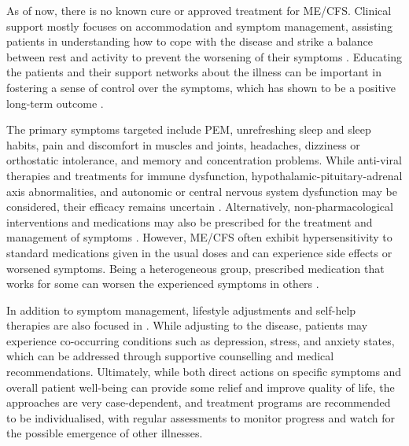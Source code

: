 As of now, there is no known cure or approved treatment for ME/CFS.
Clinical support mostly focuses on accommodation and symptom management, assisting patients in understanding how to cope with the disease and strike a balance between rest and activity to prevent the worsening of their symptoms \citep{carruthers2003MyalgicEncephalomyelitis, rowe2017MyalgicEncephalomyelitis}.
Educating the patients and their support networks about the illness can be important in fostering a sense of control over the symptoms, which has shown to be a positive long-term outcome \citep{cairns2005SystematicReview}.

The primary symptoms targeted include PEM, unrefreshing sleep and sleep habits, pain and discomfort in muscles and joints, headaches, dizziness or orthostatic intolerance, and memory and concentration problems.
While anti-viral therapies and treatments for immune dysfunction, hypothalamic-pituitary-adrenal axis abnormalities, and autonomic or central nervous system dysfunction may be considered, their efficacy remains uncertain \citep{carruthers2003MyalgicEncephalomyelitis}.
Alternatively, non-pharmacological interventions and medications may also be prescribed for the treatment and management of symptoms \citep{rowe2017MyalgicEncephalomyelitis}.
However, ME/CFS often exhibit hypersensitivity to standard medications given in the usual doses and can experience side effects or worsened symptoms.
Being a heterogeneous group, prescribed medication that works for some can worsen the experienced symptoms in others \citep{carruthers2003MyalgicEncephalomyelitis}.

In addition to symptom management, lifestyle adjustments and self-help therapies are also focused in \cfs.
While adjusting to the disease, patients may experience co-occurring conditions such as depression, stress, and anxiety states, which can be addressed through supportive counselling and medical recommendations.
Ultimately, while both direct actions on specific symptoms and overall patient well-being can provide some relief and improve quality of life, the approaches are very case-dependent, and treatment programs are recommended to be individualised, with regular assessments to monitor progress and watch for the possible emergence of other illnesses.


